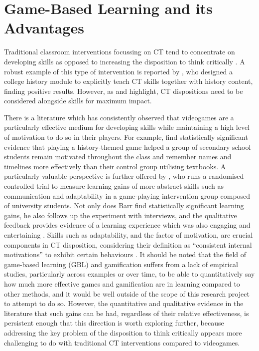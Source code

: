 \documentclass{l4proj}
\begin{document}
\section{Game-Based Learning and its Advantages}

Traditional classroom interventions focussing on CT tend to concentrate on developing skills as opposed to increasing the disposition to think critically \citep{facione2000CT,willingham2008critical,lai2011critical}. A robust example of this type of intervention is reported by \citet{reed2001teaching}, who designed a college history module to explicitly teach CT skills together with history content, finding positive results. However, as \citet{facione2000CT} and \citet{willingham2008critical} highlight, CT dispositions need to be considered alongside skills for maximum impact. 

There is a literature which has consistently observed that videogames are a particularly effective medium for developing skills while maintaining a high level of motivation to do so in their players. For example, \citet{chowanda2016gamification} find statistically significant evidence that playing a history-themed game helped a group of secondary school students remain motivated throughout the class and remember names and timelines more effectively than their control group utilising textbooks. A particularly valuable perspective is further offered by \citet{barr2019graduate}, who runs a randomised controlled trial to measure learning gains of more abstract skills such as communication and adaptability in a game-playing intervention group composed of university students. Not only does Barr find statistically significant learning gains, he also follows up the experiment with interviews, and the qualitative feedback provides evidence of a learning experience which was also engaging and entertaining \citep{barr2019graduate}. Skills such as adaptability, and the factor of motivation, are crucial components in CT disposition, considering their definition as “consistent internal motivations” to exhibit certain behaviours \citep{facione2000CT}. It should be noted that the field of game-based learning (GBL) and gamification suffers from a lack of empirical studies, particularly across examples or over time, to be able to quantitatively say how much more effective games and gamification are in learning \citep{seaborn2015gamification} compared to other methods, and it would be well outside of the scope of this research project to attempt to do so. However, the quantitative and qualitative evidence in the literature that such gains can be had, regardless of their relative effectiveness, is persistent enough that this direction is worth exploring further, because addressing the key problem of the disposition to think critically appears more challenging to do with traditional CT interventions compared to videogames.  
\end{document}
